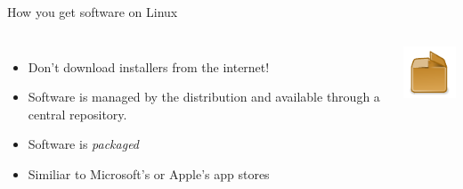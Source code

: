     \begin{frame}[t,fragile]{How you get software on Linux}
        \begin{columns}[T]
            \begin{itemize}
                \item Don't download installers from the internet!
                \item Software is managed by the distribution and available
                    through a central repository.
                \item Software is \emph{packaged}
                \item Similiar to Microsoft's or Apple's app stores
            \end{itemize}
            \vspace{-1cm}
            \begin{center}
                \includegraphics[width=0.7\columnwidth]{img/package-icon.pdf}
            \end{center}
        \end{columns}
    \end{frame}

